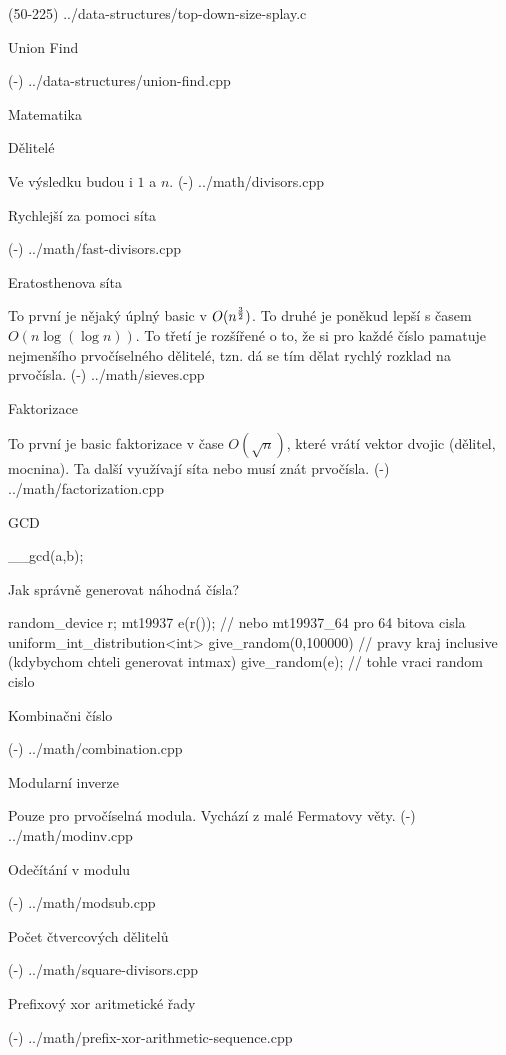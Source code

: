 \verbinput (50-225) ../data-structures/top-down-size-splay.c

\sec Union Find 

\verbinput (-) ../data-structures/union-find.cpp

\newpage

\chap Matematika

\sec Dělitelé 

Ve výsledku budou i $1$ a $n$.
\verbinput (-) ../math/divisors.cpp

\secc Rychlejší za pomoci síta 

\verbinput (-) ../math/fast-divisors.cpp

\sec Eratosthenova síta 

To první je nějaký úplný basic v $O(n^{3 \over 2})$. To druhé je poněkud lepší s časem $O(n\log(\log n))$. To třetí je rozšířené o to, že si pro každé číslo pamatuje nejmenšího prvočíselného dělitelé, tzn. dá se tím dělat rychlý rozklad na prvočísla.
\verbinput (-) ../math/sieves.cpp

\sec Faktorizace 

To první je basic faktorizace v čase $O(\sqrt n)$, které vrátí vektor dvojic (dělitel, mocnina). Ta další využívají síta nebo musí znát prvočísla.
\verbinput (-) ../math/factorization.cpp

\sec GCD 

\begtt
__gcd(a,b);
\endtt

\sec Jak správně generovat náhodná čísla? 

\begtt
  random_device r;
  mt19937 e(r()); // nebo mt19937_64 pro 64 bitova cisla
  uniform_int_distribution<int> give_random(0,100000) // pravy kraj inclusive (kdybychom chteli generovat intmax)
  give_random(e); // tohle vraci random cislo
\endtt

\sec Kombinačni číslo 

\verbinput (-) ../math/combination.cpp

\sec Modularní inverze 

Pouze pro prvočíselná modula. Vychází z malé Fermatovy věty.
\verbinput (-) ../math/modinv.cpp

\sec Odečítání v modulu 

\verbinput (-) ../math/modsub.cpp

\sec Počet čtvercových dělitelů 

\verbinput (-) ../math/square-divisors.cpp

\sec Prefixový xor aritmetické řady 

\verbinput (-) ../math/prefix-xor-arithmetic-sequence.cpp

